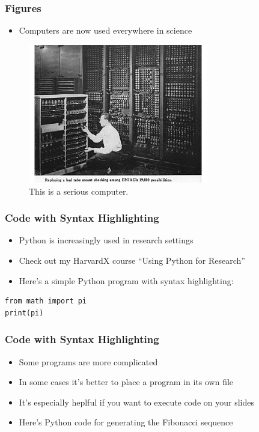 \begin{frame}[fragile]
\frametitle{Figures}
\begin{itemize}
	\item Computers are now used everywhere in science
\end{itemize}
\begin{center}  \begin{figure}
\includegraphics[width= 0.7\textwidth]{my-figure.pdf}
\caption{This is a serious computer.}
\end{figure}  \end{center}

\end{frame}
\begin{frame}[fragile]
\frametitle{Code with Syntax Highlighting}
\begin{itemize}
	\item Python is increasingly used in research settings
	\item Check out my HarvardX course ``Using Python for Research''
	\item Here's a simple Python program with syntax highlighting:
\end{itemize}
\begin{lstlisting}
from math import pi
print(pi)
\end{lstlisting}

\end{frame}
\begin{frame}[fragile]
\frametitle{Code with Syntax Highlighting}
\begin{itemize}
	\item Some programs are more complicated
	\item In some cases it's better to place a program in its own file
	\item It's especially heplful if you want to execute code on your slides
	\item Here's Python code for generating the Fibonacci sequence
\end{itemize}


\end{frame}

